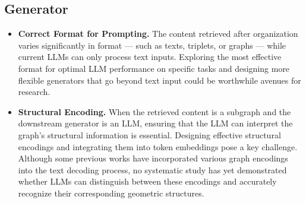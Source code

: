 \subsection{Generator}
\begin{itemize}[leftmargin=*]
    \item \textbf{Correct Format for Prompting.} The content retrieved after organization varies significantly in format — such as texts, triplets, or graphs — while current LLMs can only process text inputs. Exploring the most effective format for optimal LLM performance on specific tasks and designing more flexible generators that go beyond text input could be worthwhile avenues for research.

    \item \textbf{Structural Encoding.} When the retrieved content is a subgraph and the downstream generator is an LLM, ensuring that the LLM can interpret the graph's structural information is essential. Designing effective structural encodings and integrating them into token embeddings pose a key challenge. Although some previous works have incorporated various graph encodings into the text decoding process, no systematic study has yet demonstrated whether LLMs can distinguish between these encodings and accurately recognize their corresponding geometric structures.
\end{itemize}  


